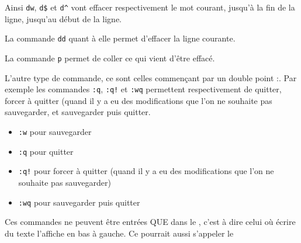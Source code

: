 \documentclass[a4paper,twoside]{article}
\begin{document}
Ainsi \texttt{dw}, \texttt{d\$} et \texttt{d\^} vont effacer respectivement le mot courant, jusqu'à la fin de la ligne, jusqu'au début de la ligne.

La commande \texttt{dd} quant à elle permet d'effacer la ligne courante.

\begin{remarque}
La commande \texttt{p} permet de coller ce qui vient d'être effacé.
\end{remarque}


\bigskip

L'autre type de commande, ce sont celles commençant par un double point \og :\fg. Par exemple les commandes \texttt{:q}, \texttt{:q!} et \texttt{:wq} permettent respectivement de quitter, forcer à quitter (quand il y a eu des modifications que l'on ne souhaite pas sauvegarder, et sauvegarder puis quitter.
\begin{itemize}
\item \texttt{:w} pour sauvegarder
\item \texttt{:q} pour quitter
\item \texttt{:q!} pour forcer à quitter (quand il y a eu des modifications que l'on ne souhaite pas sauvegarder)
\item \texttt{:wq} pour sauvegarder puis quitter
\end{itemize}

\begin{attention}
Ces commandes ne peuvent être entrées QUE dans le , c'est à dire celui où écrire du texte l'affiche en bas à gauche. Ce  pourrait aussi s'appeler le 
\end{attention}

\clearpage
\printindex
\end{document}
